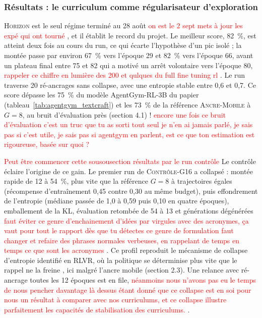 \documentclass[11pt,a4paper]{article}
\begin{document}
\subsubsection{Résultats : le curriculum comme régularisateur d'exploration}

\textsc{Horizon} est le seul régime terminé au 28 août \textcolor{red}{on est le 2 sept mets à jour les expé qui ont tourné} , et il établit le record du projet. Le meilleur score, 82~\%, est atteint deux fois au cours du run, ce qui écarte l'hypothèse d'un pic isolé ; la montée passe par environ 67~\% vers l'époque 29 et 82~\% vers l'époque 66, avant un plateau final entre 75 et 82 qui a motivé un arrêt volontaire vers l'époque 80, \textcolor{red}{rappeler ce chiffre en lumière des 200 et qulques du full fine tuning rl } . Le run traverse 20 ré-ancrages sans collapse, avec une entropie stable entre 0{,}6 et 0{,}7. Ce score dépasse les 75~\% du modèle AgentGym-RL-3B du papier (tableau~\ref{tab:agentgym_textcraft}) et les 73~\% de la référence \textsc{Ancre-Mobile} à $G=8$, au bruit d'évaluation près (section 4.1) ! \textcolor{red}{encore une fois ce bruit d'évaluation c'est un truc que tu as sorti tout seul je n'en ai jamais parlé, je sais pas si c'est utile, je sais pas si agentgym en parlent, est ce que ton estimation est rigoureuse, basée sur quoi ? } 

\textcolor{red}{Peut être commencer cette sousousection résultats par le run contrôle} Le contrôle éclaire l'origine de ce gain. Le premier run de \textsc{Contrôle-G16} a collapsé : montée rapide de 12 à 54~\%, plus vite que la référence $G=8$ à trajectoires égales (récompense d'entraînement 0{,}45 contre 0{,}30 au même budget), puis effondrement de l'entropie (médiane passée de 1{,}0 à 0{,}59 puis 0{,}10 en quatre époques), emballement de la KL, évaluation retombée de 54 à 13 et générations dégénérées \textcolor{red}{faut éviter ce genre d'enchainement d'idées par virgules avec des acronymes, ça vaut pour tout le rapport dès que tu détectes ce genre de formulation faut changer et refaire des phrases normales verbeuses, en rappelant de temps en temps ce que sont les acronymes} . Ce profil reproduit le mécanisme de collapse d'entropie identifié en RLVR, où la politique se déterminise plus vite que le rappel ne la freine \cite{cui2025entropy}, ici malgré l'ancre mobile (section 2.3). Une relance avec ré-ancrage toutes les 12 époques est en file, \textcolor{red}{néanmoins nous n'avons pas eu le temps de nous pencher davantage là dessus étant donné que ce collapse est en soi pour nous un résultat à comparer avec nos curriculums, et ce collapse illustre parfaitement les capacités de stabilisation des curriculums.} .
\end{document}
